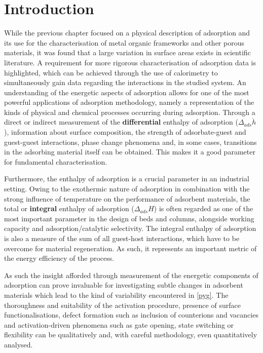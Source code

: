 
\section{Introduction}

While the previous chapter focused on a physical description
of adsorption and its use for the characterisation of
metal organic frameworks and other porous materials, it was found that 
a large variation in surface areas exists in scientific literature.
A requirement for more rigorous characterisation of adsorption data
is highlighted, which can be achieved through the use of calorimetry
to simultaneously gain data regarding the interactions in the 
studied system. An understanding of the energetic
aspects of adsorption allows for one of the most powerful
applications of adsorption methodology, namely a representation
of the kinds of physical and chemical processes occurring
during adsorption. Through a direct or indirect measurement
of the \textbf{differential} enthalpy of adsorption 
(\(\Delta_{ads} \dot{h}\)), information about surface composition, 
the strength of adsorbate-guest and guest-guest interactions, 
phase change phenomena and, in some cases, transitions in the
adsorbing material itself can be obtained. This makes it a good
parameter for fundamental characterisation.

Furthermore, the enthalpy of adsorption is a crucial parameter
in an industrial setting. Owing to the exothermic nature of
adsorption in combination with the strong influence of temperature
on the performance of adsorbent materials, the total or 
\textbf{integral} enthalpy of adsorption (\(\Delta_{ads} H\)) is
often regarded as one of the most important parameter in the
design of beds and columns, alongside working capacity and
adsorption/catalytic selectivity. The integral enthalpy of adsorption
is also a measure of the sum of all guest-host interactions, which
have to be overcome for material regeneration. As such, it
represents an important metric of the energy efficiency
of the process.

As such the insight afforded through measurement of
the energetic components of adsorption can prove invaluable
for investigating subtle changes in adsorbent materials
which lead to the kind of variability encountered in
\autoref{pyg}. The thoroughness and suitability of the activation
procedure, presence of surface functionalisations, defect
formation such as inclusion of counterions and vacancies
and activation-driven phenomena such as gate opening,
state switching or flexibility can be qualitatively and,
with careful methodology, even quantitatively analysed.

